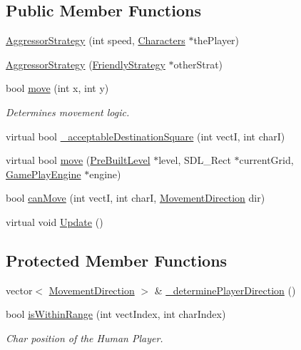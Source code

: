 \subsection*{Public Member Functions}
\begin{DoxyCompactItemize}
\item 
\hyperlink{class_aggressor_strategy_ab6f672135588d2ef8d9115535712deec}{Aggressor\+Strategy} (int speed, \hyperlink{class_characters}{Characters} $\ast$the\+Player)
\item 
\hyperlink{class_aggressor_strategy_a28ff17baf09805d74c4a970287382930}{Aggressor\+Strategy} (\hyperlink{class_friendly_strategy}{Friendly\+Strategy} $\ast$other\+Strat)
\item 
\hypertarget{class_aggressor_strategy_a0eaec48b251b374d18ae2b4865804ad6}{}\label{class_aggressor_strategy_a0eaec48b251b374d18ae2b4865804ad6} 
bool \hyperlink{class_aggressor_strategy_a0eaec48b251b374d18ae2b4865804ad6}{move} (int x, int y)
\begin{DoxyCompactList}\small\item\em Determines movement logic. \end{DoxyCompactList}\item 
virtual bool \hyperlink{class_aggressor_strategy_a2bda41203cace4fbdbcb6a05bfd5243d}{\+\_\+acceptable\+Destination\+Square} (int vectI, int charI)
\item 
virtual bool \hyperlink{class_aggressor_strategy_aa6af9166835315b10af4ada4b614f954}{move} (\hyperlink{class_pre_built_level}{Pre\+Built\+Level} $\ast$level, S\+D\+L\+\_\+\+Rect $\ast$current\+Grid, \hyperlink{class_game_play_engine}{Game\+Play\+Engine} $\ast$engine)
\item 
bool \hyperlink{class_aggressor_strategy_a48ef31f068f59cbeef6c949658103ea9}{can\+Move} (int vectI, int charI, \hyperlink{_movement_strategy_8h_a0b5e764f0ec9a407e9b8789f0259d754}{Movement\+Direction} dir)
\item 
virtual void \hyperlink{class_aggressor_strategy_ad4ccf5fe66478c9066e84f0e302d08b1}{Update} ()
\end{DoxyCompactItemize}
\subsection*{Protected Member Functions}
\begin{DoxyCompactItemize}
\item 
vector$<$ \hyperlink{_movement_strategy_8h_a0b5e764f0ec9a407e9b8789f0259d754}{Movement\+Direction} $>$ \& \hyperlink{class_aggressor_strategy_a00a432f2a77f2aa0a4b7c2abafd28b53}{\+\_\+determine\+Player\+Direction} ()
\item 
bool \hyperlink{class_aggressor_strategy_afab4da3199721fd5e4ee20833dd191ef}{is\+Within\+Range} (int vect\+Index, int char\+Index)
\begin{DoxyCompactList}\small\item\em Char position of the Human Player. \end{DoxyCompactList}\end{DoxyCompactItemize}
